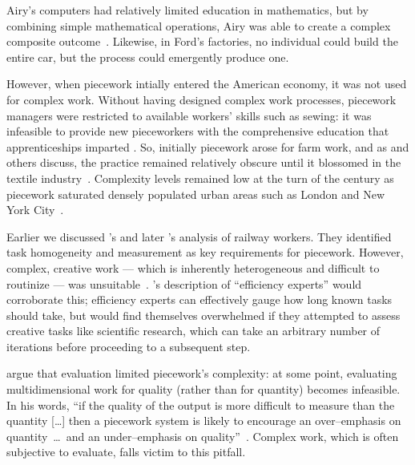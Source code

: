 \documentclass[trackingWork]{subfiles}
\begin{document}

Airy's computers had relatively limited education in mathematics, but by combining simple mathematical operations, Airy was able to create a complex composite outcome~\cite{grier2013computers}.
Likewise, in Ford's factories, no individual could build the entire car, but the process could emergently produce one.

However, when piecework intially entered the American economy,
it was not used for complex work.
Without having designed complex work processes, piecework managers were restricted to available workers' skills such as sewing: it was infeasible to provide new pieceworkers with the comprehensive education
that apprenticeships imparted \cite{hart2013rise}.
So, initially piecework arose for farm work, and as
\citeauthor{hughRaynbirdTaskWork} and others discuss,
the practice remained relatively obscure until
it blossomed in the textile industry~\cite{hughRaynbirdTaskWork}.
Complexity levels remained low at the turn of
the  century as piecework saturated densely populated urban areas
such as London and New York City~\cite{riisOtherSideLives}.

Earlier we discussed \citeauthor{10.2307/23702539}'s and later \citeauthor{Brown01041990}'s analysis of railway workers.
They identified task homogeneity and measurement as key requirements for piecework.
However, complex, creative work
--- which is inherently heterogeneous and difficult to routinize ---
was unsuitable~\cite{10.2307/23702539}.
\citeauthor{Brown01041990}'s description of ``efficiency experts'' would corroborate this;
efficiency experts can effectively gauge how long known tasks should take, but
would find themselves overwhelmed if they attempted to assess creative tasks like scientific research,
which can take an arbitrary number of iterations before proceeding to a subsequent step.


\citeauthor{hart2016rise} argue that evaluation limited piecework's complexity:
at some point, evaluating multidimensional work for quality
(rather than for quantity) becomes infeasible.
In his words,
``if the quality of the output is more difficult to measure than the quantity [\ldots]
then a piecework system is likely to encourage
an over--emphasis on quantity~\dots~and an under--emphasis on quality''~\cite{hart2016rise}.
Complex work, which is often subjective to evaluate, falls victim to this pitfall.
\end{document}

